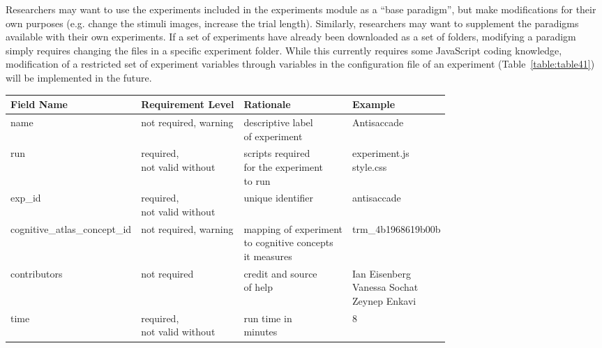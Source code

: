 \documentclass{report}
\begin{document}
Researchers may want to use the experiments included in the experiments
module as a ``base paradigm'', but make modifications for their own
purposes (e.g. change the stimuli images, increase the trial length).
Similarly, researchers may want to supplement the paradigms available
with their own experiments. If a set of experiments have already been
downloaded as a set of folders, modifying a paradigm simply requires
changing the files in a specific experiment folder. While this currently
requires some JavaScript coding knowledge, modification of a restricted
set of experiment variables through variables in the configuration file
of an experiment (Table~\ref{table:table41}) will be implemented in the future. \newline

\begin{table}[ht!]
\centering
\begin{tabular}{ | l | l | l | p{3cm} |}
    \hline
    \textbf{Field Name} & \textbf{Requirement Level} & \textbf{Rationale} & \textbf{Example} \\ \hline
    name & not required, warning & \shortstack[l]{descriptive label\\ of experiment} & Antisaccade \\ \hline
    run & \shortstack[l]{required,\\ not valid without} & \shortstack[l]{scripts required \\ for the experiment \\ to run } & \shortstack[l]{experiment.js \\ style.css } \\ \hline     
    exp\_id & \shortstack[l]{required,\\ not valid without} & unique identifier & antisaccade \\ \hline
    cognitive\_atlas\_concept\_id & not required, warning & \shortstack[l]{mapping of experiment \\ to cognitive concepts \\ it measures} & trm\_4b1968619b00b \\ \hline
    contributors & not required & \shortstack[l]{credit and source \\ of help} & \shortstack[l]{Ian Eisenberg \\ Vanessa Sochat \\ Zeynep Enkavi} \\ \hline
    time & \shortstack[l]{required,\\ not valid without} & \shortstack[l]{run time in \\ minutes} & 8 \\ \hline

\end{tabular}
\end{table}
\end{document}
